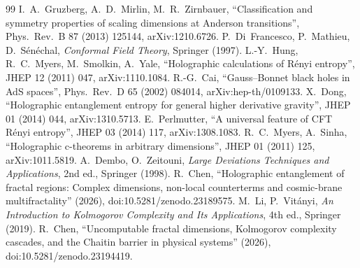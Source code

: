 \documentclass[11pt]{article}
\theoremstyle{definition}\newtheorem{definition}{Definition}[section]
\theoremstyle{remark}\newtheorem*{remark}{Remark}
\begin{document}
\begin{thebibliography}{99}
 I.~A.~Gruzberg, A.~D.~Mirlin, M.~R.~Zirnbauer, ``Classification and symmetry properties of scaling dimensions at Anderson transitions'', Phys.\ Rev.\ B 87 (2013) 125144, arXiv:1210.6726.
 P.~Di~Francesco, P.~Mathieu, D.~S\'en\'echal, \emph{Conformal Field Theory}, Springer (1997).
 L.-Y.~Hung, R.~C.~Myers, M.~Smolkin, A.~Yale, ``Holographic calculations of R\'enyi entropy'', JHEP 12 (2011) 047, arXiv:1110.1084.
 R.-G.~Cai, ``Gauss--Bonnet black holes in AdS spaces'', Phys.\ Rev.\ D 65 (2002) 084014, arXiv:hep-th/0109133.
 X.~Dong, ``Holographic entanglement entropy for general higher derivative gravity'', JHEP 01 (2014) 044, arXiv:1310.5713.
 E.~Perlmutter, ``A universal feature of CFT R\'enyi entropy'', JHEP 03 (2014) 117, arXiv:1308.1083.
 R.~C.~Myers, A.~Sinha, ``Holographic c-theorems in arbitrary dimensions'', JHEP 01 (2011) 125, arXiv:1011.5819.
 A.~Dembo, O.~Zeitouni, \emph{Large Deviations Techniques and Applications}, 2nd ed., Springer (1998).
 R.~Chen, ``Holographic entanglement of fractal regions: Complex dimensions, non-local counterterms and cosmic-brane multifractality'' (2026), doi:10.5281/zenodo.23189575.
 M.~Li, P.~Vit\'anyi, \emph{An Introduction to Kolmogorov Complexity and Its Applications}, 4th ed., Springer (2019).
 R.~Chen, ``Uncomputable fractal dimensions, Kolmogorov complexity cascades, and the Chaitin barrier in physical systems'' (2026), doi:10.5281/zenodo.23194419.
\end{thebibliography}
\end{document}
